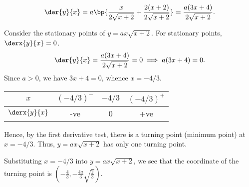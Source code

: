 \begin{solution}
    \begin{ppart}
        \[\der{y}{x} = a \bp{\frac{x}{2\sqrt{x+2}} + \frac{2(x+2)}{2\sqrt{x+2}}} = \frac{a(3x+4)}{2\sqrt{x+2}}.\]

        Consider the stationary points of $y=ax\sqrt{x+2}$. For stationary points, $\derx{y}{x} =0$. \[\der{y}{x} = \frac{a(3x+4)}{2\sqrt{x+2}} = 0 \implies a(3x+4) = 0.\] Since $a > 0$, we have $3x+4=0$, whence $x = -4/3$.

        \begin{table}[H]
            \centering
            \begin{tabular}{|c|c|c|c|}
            \hline
            $x$ & $(-4/3)^-$ & $-4/3$ & $(-4/3)^+$ \\\hline
            $\derx{y}{x}$ & -ve & 0 & +ve \\\hline
            \end{tabular}
        \end{table}

        Hence, by the first derivative test, there is a turning point (minimum point) at $x = -4/3$. Thus, $y = ax\sqrt{x+2}$ has only one turning point.

        Substituting $x = -4/3$ into $y = ax\sqrt{x+2}$, we see that the coordinate of the turning point is $(-\frac43, -\frac{4a}3 \sqrt{\frac23})$.
    \end{ppart}
    \clearpage
    \begin{ppart}
        \begin{center}
        \end{center}
    \end{ppart}
\end{solution}

